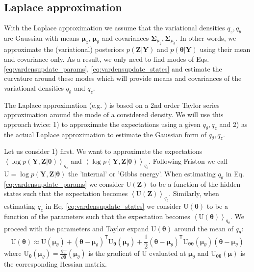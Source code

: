 \documentclass[a4paper,10pt]{article}
\newcommand{\bs}[1]{\mathbf{#1}}					%
\newcommand{\bgs}[1]{\boldsymbol{#1}}				%
\newcommand{\pd}[2]{\frac{\partial #1}{\partial #2}} 	%
\newcommand{\tr}{\mathsf{T}}				%
\newcommand{\eq}[1]{\begin{equation} #1 \end{equation}}%
\renewcommand{\ss}{z}         %
\newcommand{\spm}{\mu}    %
\renewcommand{\sp}{\theta}    %
\newcommand{\ppm}{\bgs{\spm}}   %
\newcommand{\pp}{\bgs{\sp}} %
\newcommand{\Ps}{\bs{Z}}    %
\newcommand{\Po}{\bs{Y}}    %
\newcommand{\E}[2][]{\left\langle #2 \right\rangle_{#1}}	%
\newcommand{\U}{\mathrm{U}}			%
\newcommand{\Cov}{\bgs{\Sigma}}			%
\begin{document}
\subsection{Laplace approximation}
With the Laplace approximation we assume that the variational densities $q_{\ss}, q_{\sp}$ are Gaussian with means $\ppm_{\ss}$, $\ppm_{\sp}$ and covariances $\Cov_{\spm_\ss}, \Cov_{\spm_\sp}$. In other words, we approximate the (variational) posteriors $p(\Ps|\Po)$ and $p(\pp|\Po)$ using their mean and covariance only. As a result, we only need to find modes of Eqs. \ref{eq:vardensupdate_params}, \ref{eq:vardensupdate_states} and estimate the curvature around these modes which will provide means and covariances of the variational densities $q_\sp$ and $q_\ss$.

The Laplace approximation (e.g. \cite[p. 255]{Murphy2012}) is based on a 2nd order Taylor series approximation around the mode of a considered density. We will use this approach twice: 1) to approximate the expectations using a given $q_\sp, q_\ss$ and 2) as the actual Laplace approximation to estimate the Gaussian form of $q_\sp, q_\ss$.

Let us consider 1) first. We want to approximate the expectations $\E[q_\ss]{\log p(\Po,\Ps|\pp)}$ and $\E[q_\sp]{\log p(\Po,\Ps|\pp)}$. Following Friston we call $\U = \log p(\Po,\Ps|\pp)$ the 'internal' or 'Gibbs energy'. When estimating $q_\sp$ in Eq. \ref{eq:vardensupdate_params} we consider $\U(\Ps)$ to be a function of the hidden states such that the expectation becomes $\E[q_\ss]{\U(\Ps)}$. Similarly, when estimating $q_\ss$ in Eq. \ref{eq:vardensupdate_states} we consider $\U(\pp)$ to be a function of the parameters such that the expectation becomes $\E[q_\sp]{\U(\pp)}$. We proceed with the parameters and Taylor expand $\U(\pp)$ around the mean of $q_\sp$:
\eq{
    \U(\pp) \approx \U(\ppm_\sp) + (\pp - \ppm_\sp)^\tr \U_{\pp}(\ppm_\sp) + \frac{1}{2}(\pp - \ppm_\sp)^\tr \U_{\pp\pp}(\ppm_\sp) (\pp - \ppm_\sp)
}
where $\U_{\pp}(\ppm_\sp) = \pd{\U}{\pp}(\ppm_\sp)$ is the gradient of $\U$ evaluated at $\ppm_\sp$ and $\U_{\pp\pp}(\ppm)$ is the corresponding Hessian matrix.
\end{document}
